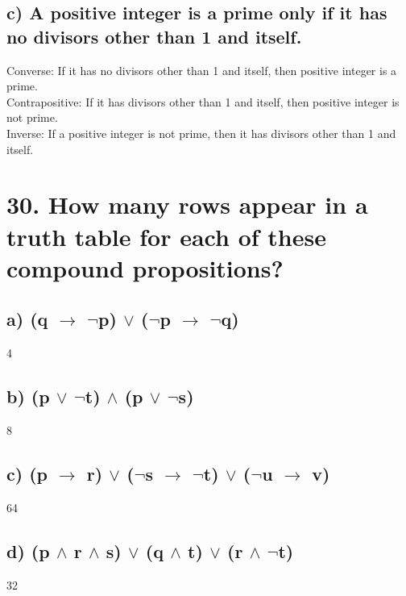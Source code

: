 \documentclass[11pt, oneside]{article} %
\numberwithin{equation}{section} %
\numberwithin{figure}{section} %
\begin{document}
\subsection{c) A positive integer is a prime only if it has no divisors
other than 1 and itself.}
Converse: If it has no divisors other than 1 and itself, then positive integer is a prime.\\
Contrapositive: If it has divisors other than 1 and itself, then positive integer is not prime.\\
Inverse: If a positive integer is not prime, then it has divisors other than 1 and itself.


\section{30. How many rows appear in a truth table for each of these
compound propositions?}
\subsection{a) (q $\rightarrow$ $\neg$p) $\vee$ ($\neg$p $\rightarrow$ $\neg$q)}
4
\subsection{b) (p $\vee$ $\neg$t) $\wedge$ (p $\vee$ $\neg$s)}
8
\subsection{c) (p $\rightarrow$ r) $\vee$ ($\neg$s $\rightarrow$ $\neg$t) $\vee$ ($\neg$u $\rightarrow$ v)}
64
\subsection{d) (p $\wedge$ r $\wedge$ s) $\vee$ (q $\wedge$ t) $\vee$ (r $\wedge$ $\neg$t)}
32

\end{document}
